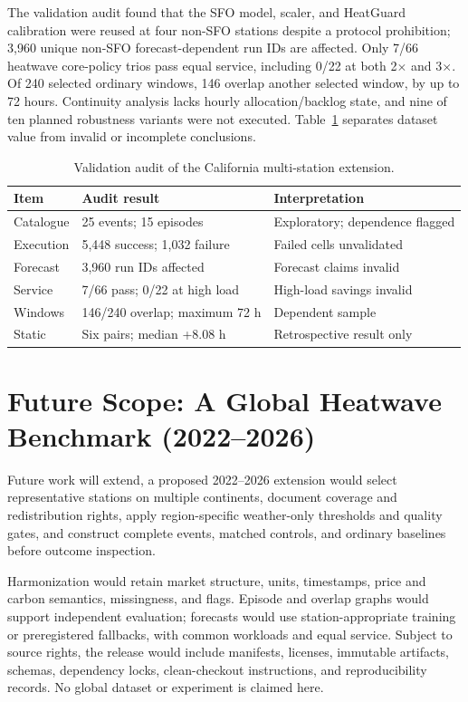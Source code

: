 \documentclass[pdflatex,sn-mathphys-num]{sn-jnl}
\begin{document}
The validation audit found that the SFO model, scaler, and HeatGuard calibration were reused at four non-SFO stations despite a protocol prohibition; 3,960 unique non-SFO forecast-dependent run IDs are affected. Only 7/66 heatwave core-policy trios pass equal service, including 0/22 at both 2$\times$ and 3$\times$. Of 240 selected ordinary windows, 146 overlap another selected window, by up to 72 hours. Continuity analysis lacks hourly allocation/backlog state, and nine of ten planned robustness variants were not executed. Table~\ref{tab:audit} separates dataset value from invalid or incomplete conclusions.

\begin{table}[t]
\caption{Validation audit of the California multi-station extension.}
\label{tab:audit}
\small
\begin{tabular}{@{}p{}p{}p{}@{}}
\toprule
\textbf{Item} & \textbf{Audit result} & \textbf{Interpretation} \\
\midrule
Catalogue & 25 events; 15 episodes & Exploratory; dependence flagged \\
Execution & 5,448 success; 1,032 failure & Failed cells unvalidated \\
Forecast & 3,960 run IDs affected & Forecast claims invalid \\
Service & 7/66 pass; 0/22 at high load & High-load savings invalid \\
Windows & 146/240 overlap; maximum 72 h & Dependent sample \\
Static & Six pairs; median +8.08 h & Retrospective result only \\
\bottomrule
\end{tabular}
\end{table}

\section{Future Scope: A Global Heatwave Benchmark (2022--2026)}\label{sec:future}

Future work will extend, a proposed 2022--2026 extension would select representative stations on multiple continents, document coverage and redistribution rights, apply region-specific weather-only thresholds and quality gates, and construct complete events, matched controls, and ordinary baselines before outcome inspection.

Harmonization would retain market structure, units, timestamps, price and carbon semantics, missingness, and flags. Episode and overlap graphs would support independent evaluation; forecasts would use station-appropriate training or preregistered fallbacks, with common workloads and equal service. Subject to source rights, the release would include manifests, licenses, immutable artifacts, schemas, dependency locks, clean-checkout instructions, and reproducibility records. No global dataset or experiment is claimed here.
\end{document}
